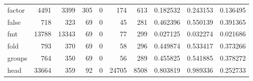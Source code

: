 \begin{tabular}{lrrrrrrrrr}
factor    &                                               4491 &                                               3399 &                                                305 &                                                  0 &                                                174 &                                                613 &                                           0.182532 &                               0.243153 &                             0.136495 \\
false     &                                                718 &                                                323 &                                                 69 &                                                  0 &                                                 45 &                                                281 &                                           0.462396 &                               0.550139 &                             0.391365 \\
fmt       &                                              13788 &                                              13343 &                                                 69 &                                                  0 &                                                 77 &                                                299 &                                           0.027125 &                               0.032274 &                             0.021686 \\
fold      &                                                793 &                                                370 &                                                 69 &                                                  0 &                                                 58 &                                                296 &                                           0.449874 &                               0.533417 &                             0.373266 \\
groups    &                                                764 &                                                350 &                                                 69 &                                                  0 &                                                 56 &                                                289 &                                           0.455825 &                               0.541885 &                             0.378272 \\
head      &                                              33664 &                                                359 &                                                 92 &                                                  0 &                                              24705 &                                               8508 &                                           0.803819 &                               0.989336 &                             0.252733 \\

\end{tabular}
